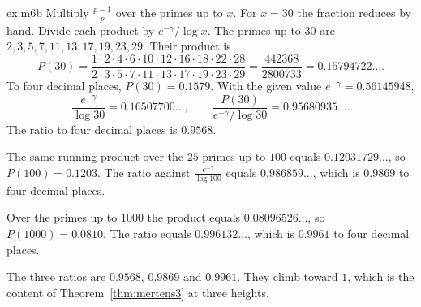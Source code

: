 \begin{solution}{ex:m6b}
\idea Multiply $\frac{p-1}p$ over the primes up to $x$. For $x=30$ the fraction reduces by hand. Divide each product by $e^{-\gamma}/\log x$.
\writeup The primes up to $30$ are $2,3,5,7,11,13,17,19,23,29$. Their product is
\[
P(30)=\frac{1\cdot 2\cdot 4\cdot 6\cdot 10\cdot 12\cdot 16\cdot 18\cdot 22\cdot 28}{2\cdot 3\cdot 5\cdot 7\cdot 11\cdot 13\cdot 17\cdot 19\cdot 23\cdot 29}=\frac{442368}{2800733}=0.15794722\ldots.
\]
To four decimal places, $P(30)=0.1579$. With the given value $e^{-\gamma}=0.56145948$,
\[
\frac{e^{-\gamma}}{\log 30}=0.16507700\ldots,\qquad\frac{P(30)}{e^{-\gamma}/\log 30}=0.95680935\ldots.
\]
The ratio to four decimal places is $0.9568$.

The same running product over the $25$ primes up to $100$ equals $0.12031729\ldots$, so $P(100)=0.1203$. The ratio against $\frac{e^{-\gamma}}{\log 100}$ equals $0.986859\ldots$, which is $0.9869$ to four decimal places.

Over the primes up to $1000$ the product equals $0.08096526\ldots$, so $P(1000)=0.0810$. The ratio equals $0.996132\ldots$, which is $0.9961$ to four decimal places.

The three ratios are $0.9568$, $0.9869$ and $0.9961$. They climb toward $1$, which is the content of Theorem~\ref{thm:mertens3} at three heights.
\end{solution}

